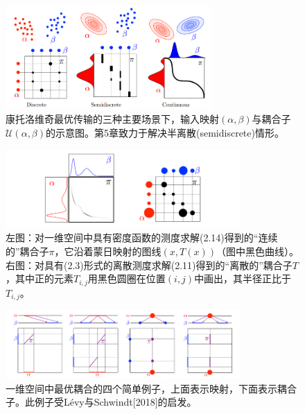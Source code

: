 \documentclass[cn,10pt,math=newtx,citestyle=gb7714-2015,bibstyle=gb7714-2015]{elegantbook}
\begin{document}
\begin{figure}[H]
    \centering
    \includegraphics[width=0.7\textwidth]{figure/fig2.5.png}
    \caption{康托洛维奇最优传输的三种主要场景下，输入映射$(\alpha,\beta)$与耦合子$\mathcal{U}(\alpha,\beta)$的示意图。第5章致力于解决半离散(semidiscrete)情形。}
    \label{图2.5}
\end{figure}

\begin{figure}[H]
    \centering
    \includegraphics[width=0.8\textwidth]{figure/fig2.6.png}
    \caption{左图：对一维空间中具有密度函数的测度求解(2.14)得到的“连续的”耦合子$\pi$，它沿着蒙日映射的图线$(x,T(x))$（图中黑色曲线）。右图：对具有(2.3)形式的离散测度求解(2.11)得到的“离散的”耦合子$T$，其中正的元素$T_{i,j}$用黑色圆圈在位置$(i,j)$中画出，其半径正比于$T_{i,j}$。}
    \label{图2.6}
\end{figure}

\begin{figure}[H]
    \centering
    \includegraphics[width=0.8\textwidth]{figure/fig2.7.png}
    \caption{一维空间中最优耦合的四个简单例子，上面表示映射，下面表示耦合子。此例子受L\'evy与Schwindt[2018]的启发。}
    \label{图2.7}
\end{figure}
\end{document}
